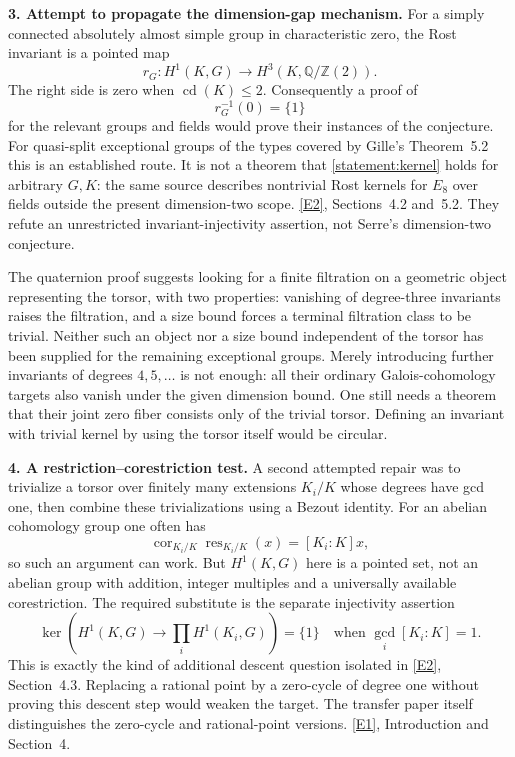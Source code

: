 \documentclass[11pt,a4paper]{article}
\newcommand{\Z}{\mathbb{Z}}
\newcommand{\Q}{\mathbb{Q}}
\newcommand{\eref}[2]{\hyperlink{extra:#1:#2}{[E#2]}}
\numberwithin{equation}{section}
\begin{document}
\textbf{3. Attempt to propagate the dimension-gap mechanism.}
For a simply connected absolutely almost simple group in characteristic
zero, the Rost invariant is a pointed map
\[
 r_G:H^1(K,G)\longrightarrow H^3(K,\Q/\Z(2)).
\]
The right side is zero when $\operatorname{cd}(K)\le2$.
Consequently a proof of
\begin{equation}\label{statement:kernel}
 r_G^{-1}(0)=\{1\}
\end{equation}
for the relevant groups and fields would prove their instances of the
conjecture. For quasi-split exceptional groups of the types covered by
Gille's Theorem~5.2 this is an established route. It is not a theorem
that \eqref{statement:kernel} holds for arbitrary $G,K$: the same source
describes nontrivial Rost kernels for $E_8$ over fields outside the
present dimension-two scope. \eref{statement}{2}, Sections~4.2 and~5.2.
They refute an unrestricted invariant-injectivity assertion, not
Serre's dimension-two conjecture.

The quaternion proof suggests looking for a finite filtration on a
geometric object representing the torsor, with two properties: vanishing
of degree-three invariants raises the filtration, and a size bound
forces a terminal filtration class to be trivial. Neither such an
object nor a size bound independent of the torsor has been supplied
for the remaining exceptional groups. Merely introducing further
invariants of degrees $4,5,\ldots$ is not enough: all their ordinary
Galois-cohomology targets also vanish under the given dimension bound.
One still needs a theorem that their joint zero fiber consists only of
the trivial torsor. Defining an invariant with trivial kernel by using
the torsor itself would be circular.

\textbf{4. A restriction--corestriction test.}
A second attempted repair was to trivialize a torsor over finitely many
extensions $K_i/K$ whose degrees have gcd one, then combine these
trivializations using a Bezout identity. For an abelian cohomology group
one often has
\[
 \operatorname{cor}_{K_i/K}\operatorname{res}_{K_i/K}(x)
          =[K_i:K]x,
\]
so such an argument can work. But $H^1(K,G)$ here is a pointed set,
not an abelian group with addition, integer multiples and a universally
available corestriction. The required substitute is the separate
injectivity assertion
\[
 \ker\left(H^1(K,G)\to\prod_i H^1(K_i,G)\right)=\{1\}
        \quad\text{when }\gcd_i[K_i:K]=1.
\]
This is exactly the kind of additional descent question isolated in
\eref{statement}{2}, Section~4.3. Replacing a rational point by a zero-cycle
of degree one without proving this descent step would weaken the target.
The transfer paper itself distinguishes the zero-cycle and rational-point
versions. \eref{statement}{1}, Introduction and Section~4.
\end{document}
